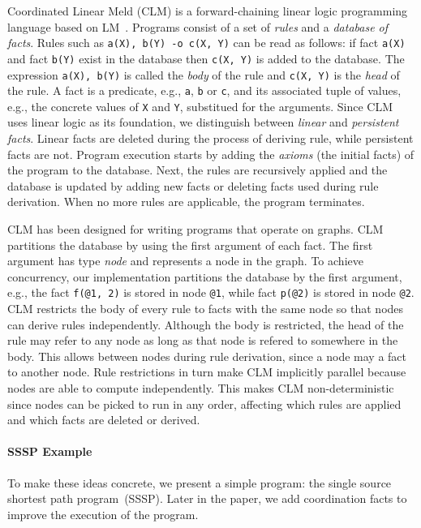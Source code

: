 Coordinated Linear Meld (CLM) is a forward-chaining linear logic programming
language based on LM~\cite{cruz-iclp14}.
Programs consist of a set of \emph{rules} and a \emph{database of facts}.
Rules such as \texttt{a(X), b(Y) -o c(X, Y)} can be read as follows: if fact \texttt{a(X)}
and fact \texttt{b(Y)} exist in the database then \texttt{c(X, Y)} is added to
the database. The expression \texttt{a(X), b(Y)} is called the \emph{body} of
the rule and \texttt{c(X, Y)} is the \emph{head} of the rule.
A fact is a predicate, e.g., \texttt{a}, \texttt{b} or \texttt{c}, and its
associated tuple of values, e.g., the concrete values of \texttt{X} and
\texttt{Y}, substitued for the
arguments. Since CLM uses linear logic as its foundation, we distinguish between
\emph{linear} and \emph{persistent facts}. Linear facts are deleted during the
process of deriving rule, while persistent facts are not.
Program execution starts by adding the \emph{axioms} (the initial facts) of the program to the database.
Next, the rules are recursively applied and the database is updated by adding
new facts or deleting facts used during rule derivation.
When no more rules are applicable, the program terminates.

CLM has been designed for writing programs that operate on graphs. CLM partitions
the database by using the first argument of each fact. The first argument has
type \emph{node} and represents a node in the graph. To achieve concurrency,
our implementation partitions the database by the first argument, e.g.,
the fact \texttt{f(@1, 2)} is stored in node \texttt{@1}, while
fact \texttt{p(@2)} is stored in node \texttt{@2}. CLM restricts the body of
every rule to facts with the same node so that nodes can derive rules
independently. Although the body is restricted, the head of the rule may refer
to any node as long as that node is refered to somewhere in the body. This allows
 between nodes during rule derivation, since a node may
 a fact to another node.  Rule restrictions in turn make CLM
implicitly parallel because nodes are able to compute independently. This makes
CLM non-deterministic since nodes can be picked to run in any order, affecting
which rules are applied and which facts are deleted or derived.

\paragraph{SSSP Example}
To make these ideas concrete, we present a simple
program: the single source shortest path program~(SSSP). Later in the paper, we
add coordination facts to improve the execution of the program.


